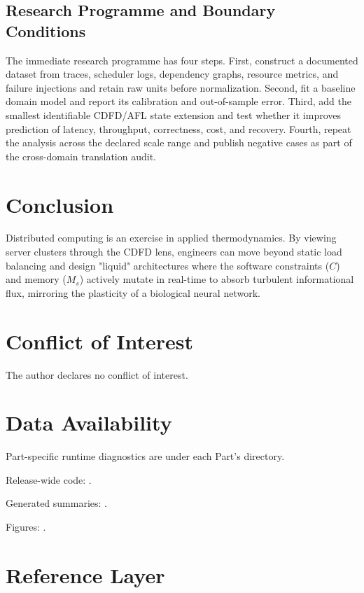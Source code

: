 \documentclass[11pt,a4paper]{article}
\begin{document}
\subsection{Research Programme and Boundary Conditions}

The immediate research programme has four steps. First, construct a documented
dataset from traces, scheduler logs, dependency graphs, resource metrics, and failure injections and retain raw units before normalization.
Second, fit a baseline domain model and report its calibration and out-of-sample
error. Third, add the smallest identifiable CDFD/AFL state extension and test
whether it improves prediction of latency, throughput, correctness, cost, and recovery. Fourth, repeat the
analysis across the declared scale range and publish negative cases as part of
the cross-domain translation audit.


\section{Conclusion}
Distributed computing is an exercise in applied thermodynamics. By viewing server clusters through the CDFD lens, engineers can move beyond static load balancing and design "liquid" architectures where the software constraints ($C$) and memory ($M_s$) actively mutate in real-time to absorb turbulent informational flux, mirroring the plasticity of a biological neural network.
\section*{Conflict of Interest} The author declares no conflict of interest.
\section*{Data Availability}
Part-specific runtime diagnostics are under each Part's  directory.

Release-wide code: .

Generated summaries: .

Figures: .


\section{Reference Layer}


\end{document}

